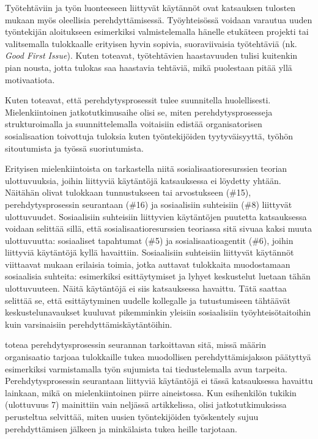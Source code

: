 \documentclass[utf8]{gradu3}
\begin{document}
Työtehtäviin ja työn luonteeseen liittyvät käytännöt ovat katsauksen tulosten mukaan myös oleellisia perehdyttämisessä. Työyhteisössä voidaan varautua uuden työntekijän aloitukseen esimerkiksi valmistelemalla hänelle etukäteen projekti tai valitsemalla tulokkaalle erityisen hyvin sopivia, suoraviivaisia työtehtäviä (nk. \textit{Good First Issue}). Kuten \textcite{ju-ym-2021} toteavat, työtehtävien haastavuuden tulisi kuitenkin pian nousta, jotta tulokas saa haastavia tehtäviä, mikä puolestaan pitää yllä motivaatiota.

Kuten \textcite{britto-ym-2020} toteavat, että perehdytysprosessit tulee suunnitella huolellisesti. Mielenkiintoinen jatkotutkimusaihe olisi se, miten perehdytysprosesseja strukturoimalla ja suunnittelemalla voitaisiin edistää organisatorisen sosialisaation toivottuja tuloksia kuten työntekijöiden tyytyväisyyttä, työhön sitoutumista ja työssä suoriutumista.

Erityisen mielenkiintoista on tarkastella niitä sosialisaatioresurssien teorian ulottuvuuksia, joihin liittyviä käytäntöjä katsauksessa ei löydetty yhtään. Näitähän olivat tulokkaan tunnustukseen tai arvostukseen (\#15), perehdytysprosessin seurantaan (\#16) ja sosiaalisiin suhteisiin (\#8) liittyvät ulottuvuudet. Sosiaalisiin suhteisiin liittyvien käytäntöjen puutetta katsauksessa voidaan selittää sillä, että sosialisaatioresurssien teoriassa sitä sivuaa kaksi muuta ulottuvuutta: sosiaaliset tapahtumat (\#5) ja sosialisaatioagentit (\#6), joihin liittyviä käytäntöjä kyllä havaittiin. Sosiaalisiin suhteisiin liittyvät käytännöt viittaavat \textcite{wanberg-2012} mukaan erilaisia toimia, jotka auttavat tulokkaita muodostamaan sosiaalisia suhteita: esimerkiksi esittäytymiset ja lyhyet keskustelut luetaan tähän ulottuvuuteen. Näitä käytäntöjä ei siis katsauksessa havaittu. Tätä saattaa selittää se, että esittäytyminen uudelle kollegalle ja tutustumiseen tähtäävät keskustelunavaukset kuuluvat pikemminkin yleisiin sosiaalisiin työyhteisötaitoihin kuin varsinaisiin perehdyttämiskäytäntöihin. 

\textcite{wanberg-2012} toteaa perehdytysprosessin seurannan tarkoittavan sitä, missä määrin organisaatio tarjoaa tulokkaille tukea muodollisen perehdyttämisjakson päätyttyä esimerkiksi varmistamalla työn sujumista tai tiedustelemalla avun tarpeita. Perehdytysprosessin seurantaan liittyviä käytäntöjä ei tässä katsauksessa havaittu lainkaan, mikä on mielenkiintoinen piirre aineistossa. Kun esihenkilön tukikin (ulottuvuus 7) mainittiin vain neljässä artikkelissa, olisi jatkotutkimuksissa perusteltua selvittää, miten uusien työntekijöiden työskentely sujuu perehdyttämisen jälkeen ja minkälaista tukea heille tarjotaan.
\end{document}
